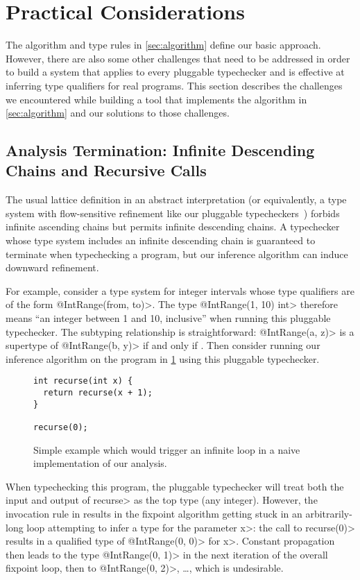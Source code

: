 \section{Practical Considerations}
\label{sec:difficulties}

The algorithm and type rules in \cref{sec:algorithm} define our
basic approach. However, there are also some other challenges
that need to be addressed in order to build a system that applies
to every pluggable typechecker and is effective at inferring
type qualifiers for real programs. This section describes the
challenges we encountered while building a tool that implements
the algorithm in \cref{sec:algorithm} and our solutions to those
challenges.

\subsection{Analysis Termination: Infinite Descending Chains and Recursive Calls}
\label{sec:infinite-descending-chains}

The usual lattice definition in an abstract interpretation
(or equivalently, a type system with flow-sensitive refinement like our
pluggable typecheckers~\cite{Cousot1997}) forbids
infinite ascending chains but permits infinite descending chains.
A typechecker whose type system includes an infinite descending chain
is guaranteed to terminate when typechecking a program, but our
inference algorithm can induce downward refinement.

For example, consider a type system for integer intervals
whose type qualifiers are of the form \<@IntRange(from, to)>.
The type \<@IntRange(1, 10) int> therefore means ``an integer between
1 and 10, inclusive'' when running this pluggable typechecker.
The subtyping relationship is straightforward: \<@IntRange(a, z)>
is a supertype of \<@IntRange(b, y)> if and only if .
Then consider running our inference algorithm on the program in \cref{fig:descend}
using this pluggable typechecker.

\begin{figure}
\begin{verbatim}
int recurse(int x) {
  return recurse(x + 1);
}

recurse(0);
\end{verbatim}
\caption{Simple example which would trigger an infinite loop in a naive
  implementation of our analysis.}
\label{fig:descend}
\end{figure}

When typechecking this program, the pluggable typechecker will
treat both the input and output of \<recurse> as the top type
(\ie any integer). However, the invocation rule in 
results in the fixpoint algorithm getting stuck in an arbitrarily-long
loop attempting to infer a type for the parameter \<x>: the call to \<recurse(0)>
results in a qualified type of \<@IntRange(0, 0)> for \<x>. Constant
propagation then leads to the type \<@IntRange(0, 1)> in the next iteration
of the overall fixpoint loop, then to \<@IntRange(0, 2)>, \ldots, which
is undesirable.

